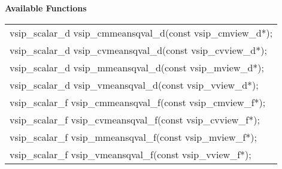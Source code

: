 \cvsiplh
\newline \hspace*{.8cm} \vspace*{.1cm} \textbf{Available Functions }
\newline \hspace*{1.1cm} {
\ttfamily
\begin{tabular}[H]{l}
vsip\_scalar\_d vsip\_cmmeansqval\_d(const vsip\_cmview\_d*);\\
vsip\_scalar\_d vsip\_cvmeansqval\_d(const vsip\_cvview\_d*);\\
vsip\_scalar\_d vsip\_mmeansqval\_d(const vsip\_mview\_d*);\\
vsip\_scalar\_d vsip\_vmeansqval\_d(const vsip\_vview\_d*);\\
vsip\_scalar\_f vsip\_cmmeansqval\_f(const vsip\_cmview\_f*);\\
vsip\_scalar\_f vsip\_cvmeansqval\_f(const vsip\_cvview\_f*);\\
vsip\_scalar\_f vsip\_mmeansqval\_f(const vsip\_mview\_f*);\\
vsip\_scalar\_f vsip\_vmeansqval\_f(const vsip\_vview\_f*);\\
\end{tabular}
}
\pyjvsiph
{}
